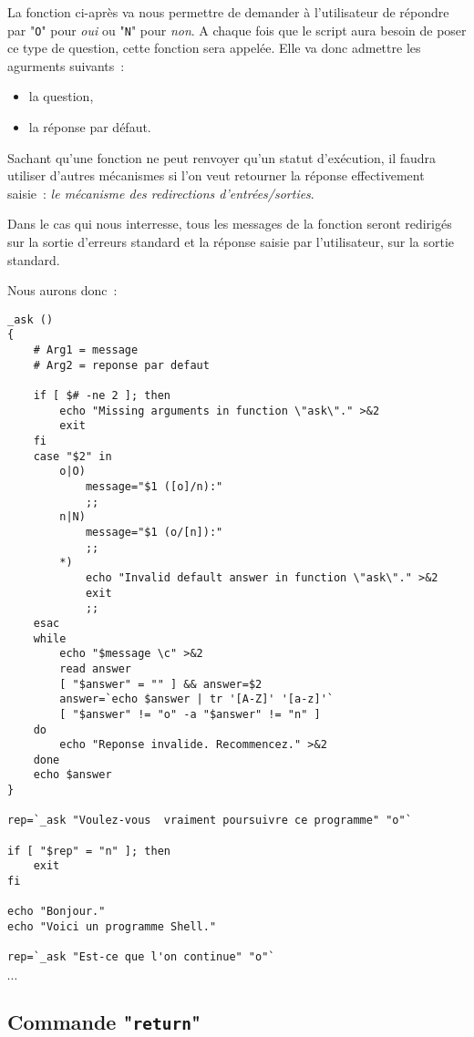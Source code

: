 \begin{example}
La fonction ci-apr{\`e}s va nous permettre de demander {\`a} l'utilisateur de r{\'e}pondre par
"\texttt{O}" pour {\sl oui} ou "\texttt{N}" pour {\sl non}. A chaque fois que le
script aura besoin de poser ce type de question, cette fonction sera appel{\'e}e. Elle
va donc admettre les agurments suivants~:
\begin{itemize}
	\item	la question,
	\item	la r{\'e}ponse par d{\'e}faut.
\end{itemize}

Sachant qu'une fonction ne peut renvoyer qu'un statut d'ex{\'e}cution, il faudra utiliser d'autres
m{\'e}canismes si l'on veut retourner la r{\'e}ponse effectivement saisie~: {\sl le m{\'e}canisme des
redirections d'entr{\'e}es/sorties}.

Dans le cas qui nous interresse, tous les messages de la fonction seront redirig{\'e}s sur la sortie
d'erreurs standard et la r{\'e}ponse saisie par l'utilisateur, sur la sortie standard.

Nous aurons donc~:

\begin{verbatim}
_ask ()
{
    # Arg1 = message
    # Arg2 = reponse par defaut

    if [ $# -ne 2 ]; then
        echo "Missing arguments in function \"ask\"." >&2
        exit
    fi
    case "$2" in
        o|O)
            message="$1 ([o]/n):"
            ;;
        n|N)
            message="$1 (o/[n]):"
            ;;
        *)
            echo "Invalid default answer in function \"ask\"." >&2
            exit
            ;;
    esac
    while
        echo "$message \c" >&2
        read answer
        [ "$answer" = "" ] && answer=$2
        answer=`echo $answer | tr '[A-Z]' '[a-z]'`
        [ "$answer" != "o" -a "$answer" != "n" ]
    do
        echo "Reponse invalide. Recommencez." >&2
    done
    echo $answer
}

rep=`_ask "Voulez-vous  vraiment poursuivre ce programme" "o"`

if [ "$rep" = "n" ]; then
    exit
fi

echo "Bonjour."
echo "Voici un programme Shell."

rep=`_ask "Est-ce que l'on continue" "o"`
\end{verbatim}
$\cdots$
\end{example}

\subsection{Commande "\texttt{return}"}

